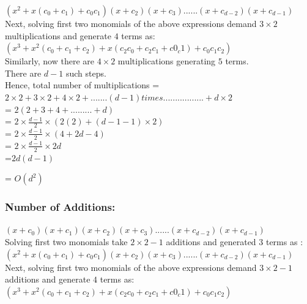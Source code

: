 \documentclass{llncs}
\begin{document}
$(x^2+x(c_0+c_1)+c_0c_1)(x+c_2)(x+c_3)......(x+c_{d-2})(x+c_{d-1})$\\

Next, solving first two monomials of the above expressions demand $3 \times 2$ multiplications and generate $4$ terms as:\\

$(x^3 + x^2(c_0+c_1+c_2) +x(c_2c_0+c_2c_1+c0_c1) + c_0c_1c_2 )$\\

Similarly, now there are $4 \times 2$ multiplications generating $5$ terms. \\

There are $d-1$ such steps.\\

Hence, total number of multiplications = $2 \times 2 + 3 \times 2+ 4 \times 2 + .......(d-1) times................. + d \times 2    $\\

= $2 (2 + 3 + 4 + ......... + d )$\\

= $2 \times \frac{d-1}{2} \times (2 (2) + (d-1-1) \times 2)$\\

= $2 \times \frac{d-1}{2} \times (4 + 2d - 4)$\\

= $2 \times \frac{d-1}{2} \times 2d$\\

=$2 d (d - 1)$

= $O(d^2)$



\subsubsection{Number of Additions:}

$(x+c_0)(x+c_1)(x+c_2)(x+c_3)......(x+c_{d-2})(x+c_{d-1})$\\

Solving first two monomials take $2 \times 2 - 1$ additions and generated $3$ terms as :\\

$(x^2+x(c_0+c_1)+c_0c_1)(x+c_2)(x+c_3)......(x+c_{d-2})(x+c_{d-1})$\\

Next, solving first two monomials of the above expressions demand $3 \times 2 - 1$ additions and generate $4$ terms as:\\

$(x^3 + x^2(c_0+c_1+c_2) +x(c_2c_0+c_2c_1+c0_c1) + c_0c_1c_2 )$\\
\end{document}
